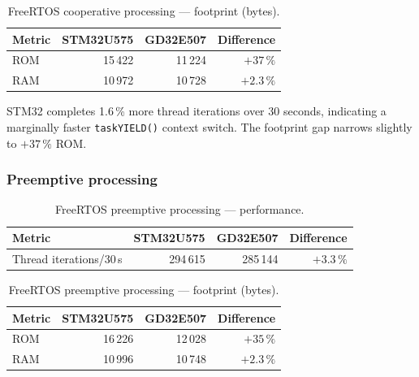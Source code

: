 \begin{table}[H]
  \centering
  \caption{FreeRTOS cooperative processing --- footprint (bytes).}
  \label{tab:gd32-freertos-coop-fp}
  \begin{tabular}{l r r r}
    \toprule
    \textbf{Metric} & \textbf{STM32U575} & \textbf{GD32E507} & \textbf{Difference} \\
    \midrule
    ROM & 15\,422 & 11\,224 & $+37\,\%$ \\
    RAM & 10\,972 & 10\,728 & $+2.3\,\%$ \\
    \bottomrule
  \end{tabular}
\end{table}

STM32 completes 1.6\,\% more thread iterations over 30 seconds, indicating a marginally
faster \texttt{taskYIELD()} context switch. The footprint gap narrows slightly to
$+37\,\%$ ROM.

\subsubsection{Preemptive processing}
\label{sec:gd32-freertos-preemptive}

\begin{table}[H]
  \centering
  \caption{FreeRTOS preemptive processing --- performance.}
  \label{tab:gd32-freertos-preemptive-perf}
  \begin{tabular}{l r r r}
    \toprule
    \textbf{Metric} & \textbf{STM32U575} & \textbf{GD32E507} & \textbf{Difference} \\
    \midrule
    Thread iterations/30\,s & 294\,615 & 285\,144 & $+3.3\,\%$ \\
    \bottomrule
  \end{tabular}
\end{table}

\begin{table}[H]
  \centering
  \caption{FreeRTOS preemptive processing --- footprint (bytes).}
  \label{tab:gd32-freertos-preemptive-fp}
  \begin{tabular}{l r r r}
    \toprule
    \textbf{Metric} & \textbf{STM32U575} & \textbf{GD32E507} & \textbf{Difference} \\
    \midrule
    ROM & 16\,226 & 12\,028 & $+35\,\%$ \\
    RAM & 10\,996 & 10\,748 & $+2.3\,\%$ \\
    \bottomrule
  \end{tabular}
\end{table}

